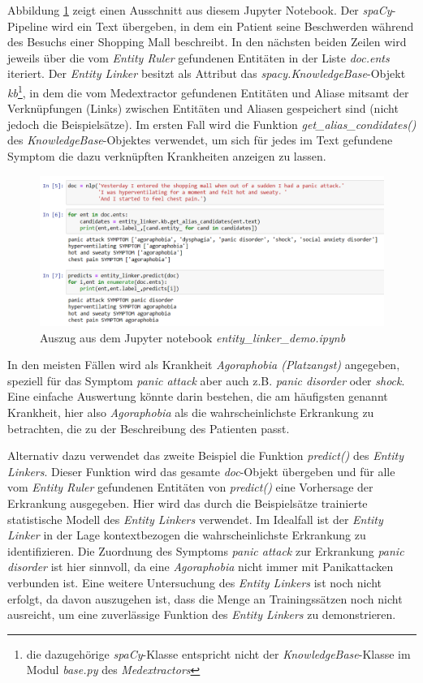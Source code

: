 Abbildung \ref{fig:jupyter} zeigt einen Ausschnitt aus diesem Jupyter Notebook. Der \emph{spaCy}-Pipeline wird ein Text übergeben, in dem ein Patient seine Beschwerden während des Besuchs einer Shopping Mall beschreibt. In den nächsten beiden Zeilen wird jeweils über die vom \emph{Entity Ruler} gefundenen Entitäten in der Liste \emph{doc.ents} iteriert. Der \emph{Entity Linker} besitzt als Attribut das \emph{spacy.KnowledgeBase}-Objekt \emph{kb}\footnote{die dazugehörige \emph{spaCy}-Klasse entspricht nicht der \emph{KnowledgeBase}-Klasse im Modul \emph{base.py} des \emph{Medextractors}}, in dem die vom Medextractor gefundenen Entitäten und Aliase mitsamt der Verknüpfungen (Links) zwischen Entitäten und Aliasen gespeichert sind (nicht jedoch die Beispielsätze). Im ersten Fall wird die Funktion \emph{get\_alias\_condidates()} des \emph{KnowledgeBase}-Objektes verwendet, um sich für jedes im Text gefundene Symptom die dazu verknüpften Krankheiten anzeigen zu lassen.

\begin{figure}[h]
    \centering
    \includegraphics[width=\textwidth]{pictures/EntityLinkerDemo.png}
    \caption{Auszug aus dem Jupyter notebook \emph{entity\_linker\_demo.ipynb}}
    \label{fig:jupyter}
\end{figure}

In den meisten Fällen wird als Krankheit \emph{Agoraphobia (Platzangst)} angegeben, speziell für das Symptom \emph{panic attack} aber auch z.B. \emph{panic disorder} oder \emph{shock}. Eine einfache Auswertung könnte darin bestehen, die am häufigsten genannt Krankheit, hier also \emph{Agoraphobia} als die wahrscheinlichste Erkrankung zu betrachten, die zu der Beschreibung des Patienten passt.

Alternativ dazu verwendet das zweite Beispiel die Funktion \emph{predict()} des \emph{Entity Linkers}. Dieser Funktion wird das gesamte \emph{doc}-Objekt übergeben und für alle vom \emph{Entity Ruler} gefundenen Entitäten von \emph{predict()} eine Vorhersage der Erkrankung ausgegeben. Hier wird das durch die Beispielsätze trainierte statistische Modell des \emph{Entity Linkers} verwendet. Im Idealfall ist der \emph{Entity Linker} in der Lage kontextbezogen die wahrscheinlichste Erkrankung zu identifizieren. Die Zuordnung des Symptoms \emph{panic attack} zur Erkrankung \emph{panic disorder} ist hier sinnvoll, da eine \emph{Agoraphobia} nicht immer mit Panikattacken verbunden ist. Eine weitere Untersuchung des \emph{Entity Linkers} ist noch nicht erfolgt, da davon auszugehen ist, dass die Menge an Trainingssätzen noch nicht ausreicht, um eine zuverlässige Funktion des \emph{Entity Linkers} zu demonstrieren.

